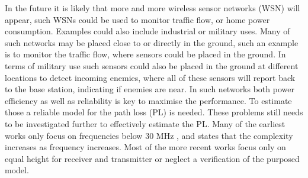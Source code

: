 
In the future it is likely that more and more wireless sensor networks (WSN) will appear, such WSNs could be used to monitor traffic flow, or home power consumption. Examples could also include industrial or military uses. Many of such networks may be placed close to or directly in the ground, such an example is to monitor the traffic flow, where sensors could be placed in the ground. In terms of military use such sensors could also be placed in the ground at different locations to detect incoming enemies, where all of these sensors will report back to the base station, indicating if enemies are near. In such networks both power efficiency as well as reliability is key to maximise the performance. To estimate those a reliable model for the path loss (PL) is needed.
These problems still needs to be investigated further to effectively estimate the PL. Many of the earliest works only focus on frequencies below 30 MHz \cite{Bullington}, and states that the complexity increases as frequency increases. Most of the more recent works focus only on equal height for receiver and transmitter or neglect a verification of the purposed model. 


